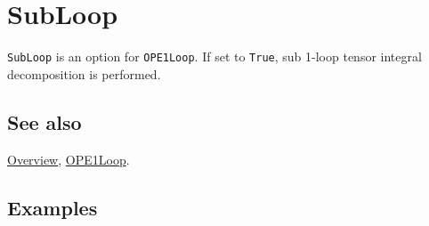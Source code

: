 \documentclass[../FeynCalcManual.tex]{subfiles}
\begin{document}
\hypertarget{subloop}{%
\section{SubLoop}\label{subloop}}

\texttt{SubLoop} is an option for \texttt{OPE1Loop}. If set to
\texttt{True}, sub 1-loop tensor integral decomposition is performed.

\subsection{See also}

\hyperlink{toc}{Overview}, \hyperlink{ope1loop}{OPE1Loop}.

\subsection{Examples}
\end{document}
